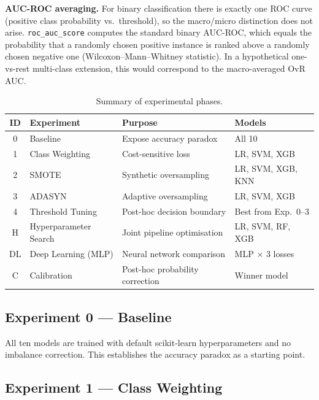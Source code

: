 \documentclass[11pt,a4paper]{article}
\begin{document}
\noindent\textbf{AUC-ROC averaging.}
For binary classification there is exactly one ROC curve (positive class probability vs.\ threshold), so the macro/micro distinction does not arise.
\texttt{roc\_auc\_score} computes the standard binary AUC-ROC, which equals the probability that a randomly chosen positive instance is ranked above a randomly chosen negative one (Wilcoxon–Mann–Whitney statistic).
In a hypothetical one-vs-rest multi-class extension, this would correspond to the macro-averaged OvR AUC.

\begin{table}[H]
  \centering
  \caption{Summary of experimental phases.}
  \label{tab:exp_summary}
  \renewcommand{\arraystretch}{1.1}
  \begin{tabular}{clll}
    \toprule
    \textbf{ID} & \textbf{Experiment} & \textbf{Purpose} & \textbf{Models} \\
    \midrule
    0 & Baseline               & Expose accuracy paradox        & All 10 \\
    1 & Class Weighting        & Cost-sensitive loss             & LR, SVM, XGB \\
    2 & SMOTE                  & Synthetic oversampling          & LR, SVM, XGB, KNN \\
    3 & ADASYN                 & Adaptive oversampling           & LR, SVM, XGB \\
    4 & Threshold Tuning       & Post-hoc decision boundary      & Best from Exp.\ 0–3 \\
    H & Hyperparameter Search  & Joint pipeline optimisation     & LR, SVM, RF, XGB \\
    DL & Deep Learning (MLP)   & Neural network comparison       & MLP $\times$ 3 losses \\
    C & Calibration            & Post-hoc probability correction & Winner model \\
    \bottomrule
  \end{tabular}
\end{table}

\subsection{Experiment 0 — Baseline}

All ten models are trained with default scikit-learn hyperparameters and no imbalance correction.
This establishes the accuracy paradox as a starting point.

\subsection{Experiment 1 — Class Weighting}
\end{document}
